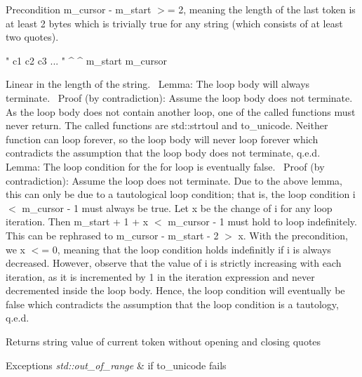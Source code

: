 \begin{DoxyPrecond}{Precondition}
{\ttfamily m\+\_\+cursor -\/ m\+\_\+start $>$= 2}, meaning the length of the last token is at least 2 bytes which is trivially true for any string (which consists of at least two quotes). \begin{DoxyVerb}" c1 c2 c3 ... "
^                ^
m_start          m_cursor
\end{DoxyVerb}

\end{DoxyPrecond}
Linear in the length of the string.~\newline
 Lemma\+: The loop body will always terminate.~\newline
 Proof (by contradiction)\+: Assume the loop body does not terminate. As the loop body does not contain another loop, one of the called functions must never return. The called functions are {\ttfamily std\+::strtoul} and to\+\_\+unicode. Neither function can loop forever, so the loop body will never loop forever which contradicts the assumption that the loop body does not terminate, q.\+e.\+d.~\newline
 Lemma\+: The loop condition for the for loop is eventually false.~\newline
 Proof (by contradiction)\+: Assume the loop does not terminate. Due to the above lemma, this can only be due to a tautological loop condition; that is, the loop condition i $<$ m\+\_\+cursor -\/ 1 must always be true. Let x be the change of i for any loop iteration. Then m\+\_\+start + 1 + x $<$ m\+\_\+cursor -\/ 1 must hold to loop indefinitely. This can be rephrased to m\+\_\+cursor -\/ m\+\_\+start -\/ 2 $>$ x. With the precondition, we x $<$= 0, meaning that the loop condition holds indefinitly if i is always decreased. However, observe that the value of i is strictly increasing with each iteration, as it is incremented by 1 in the iteration expression and never decremented inside the loop body. Hence, the loop condition will eventually be false which contradicts the assumption that the loop condition is a tautology, q.\+e.\+d.

\begin{DoxyReturn}{Returns}
string value of current token without opening and closing quotes 
\end{DoxyReturn}

\begin{DoxyExceptions}{Exceptions}
{\em std\+::out\+\_\+of\+\_\+range} & if to\+\_\+unicode fails \\
\hline
\end{DoxyExceptions}
\hypertarget{classnlohmann_1_1basic__json_1_1lexer_a94193a4904687939efe186d2ae4397a1}{}\label{classnlohmann_1_1basic__json_1_1lexer_a94193a4904687939efe186d2ae4397a1} 
